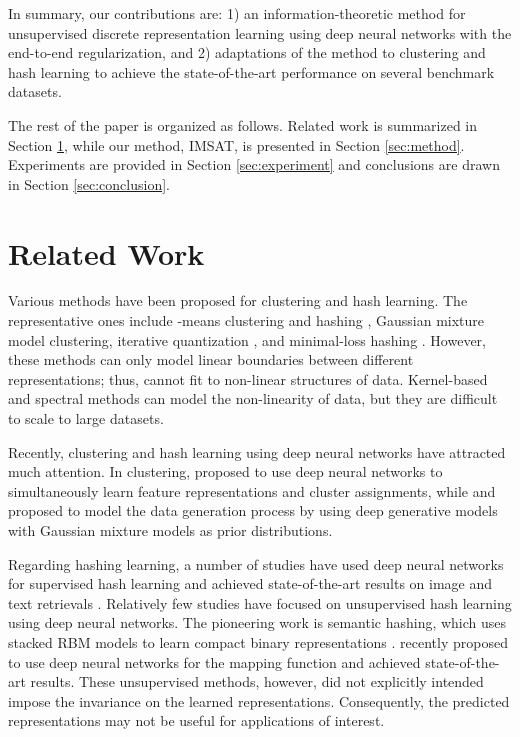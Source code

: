\documentclass{article}
\theoremstyle{plain}
\begin{document}
In summary, our contributions are: 1) an information-theoretic method for unsupervised discrete representation learning using deep neural networks with the end-to-end regularization, and 2) adaptations of the method to clustering and hash learning to achieve the state-of-the-art performance on several benchmark datasets.

The rest of the paper is organized as follows. 
Related work is summarized in Section \ref{sec:related}, while our method, IMSAT, is presented in Section \ref{sec:method}. 
Experiments are provided in Section \ref{sec:experiment} and conclusions are drawn in Section \ref{sec:conclusion}.

\section{Related Work} \label{sec:related}








Various methods have been proposed for clustering and hash learning.
The representative ones include -means clustering and hashing \citep{he2013k}, Gaussian mixture model clustering, iterative quantization \citep{gong2013iterative}, and minimal-loss hashing \citep{norouzi2011minimal}. 
However, these methods can only model linear boundaries between different representations; thus, cannot fit to non-linear structures of data.
Kernel-based \citep{xu2004maximum, kulis2009learning} and spectral \citep{ng2001spectral, weiss2009spectral} methods can model the non-linearity of data, but they are difficult to scale to large datasets. 

Recently, clustering and hash learning using deep neural networks have attracted much attention. In clustering, \citet{xie2016unsupervised} proposed to use deep neural networks to simultaneously learn feature representations and cluster assignments, while \citet{dilokthanakul2016deep} and \citet{zheng2016variational} proposed to model the data generation process by using deep generative models with Gaussian mixture models as prior distributions. 

Regarding hashing learning, a number of studies have used deep neural networks for supervised hash learning and achieved state-of-the-art results on image and text retrievals \citep{xia2014supervised, lai2015simultaneous, zhang2015bit, xu2015convolutional, li2015feature}. 
Relatively few studies have focused on unsupervised hash learning using deep neural networks. 
The pioneering work is semantic hashing, which uses stacked RBM models to learn compact binary representations \citep{salakhutdinov2009semantic}. 
\citet{erin2015deep} recently proposed to use deep neural networks for the mapping function and achieved state-of-the-art results. 
These unsupervised methods, however, did not explicitly intended impose the invariance on the learned representations. 
Consequently, the predicted representations may not be useful for applications of interest.
\end{document}

